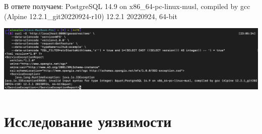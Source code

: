 \documentclass{article}
\begin{document}
В ответе получаем: PostgreSQL 14.9 on x86\_64-pc-linux-musl, compiled by gcc (Alpine 12.2.1\_git20220924-r10) 12.2.1 20220924, 64-bit

\begin{center}
  \includegraphics[width=.9\textwidth]{ing.png}
\end{center}

\section{Исследование уязвимости}
\end{document}

